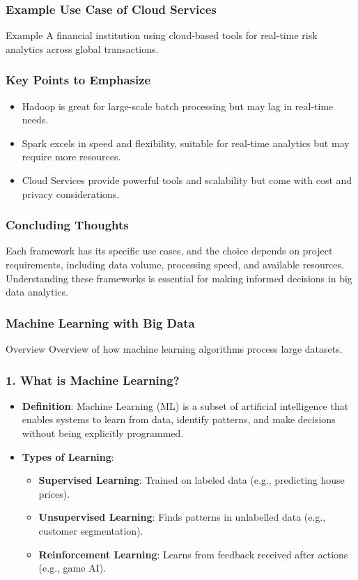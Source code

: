 \documentclass[aspectratio=169]{beamer}
\begin{document}
\begin{frame}[fragile]
    \frametitle{Example Use Case of Cloud Services}
    \begin{block}{Example}
        A financial institution using cloud-based tools for real-time risk analytics across global transactions.
    \end{block}
\end{frame}

\begin{frame}[fragile]
    \frametitle{Key Points to Emphasize}
    \begin{itemize}
        \item Hadoop is great for large-scale batch processing but may lag in real-time needs.
        \item Spark excels in speed and flexibility, suitable for real-time analytics but may require more resources.
        \item Cloud Services provide powerful tools and scalability but come with cost and privacy considerations.
    \end{itemize}
\end{frame}

\begin{frame}[fragile]
    \frametitle{Concluding Thoughts}
    Each framework has its specific use cases, and the choice depends on project requirements, including data volume, processing speed, and available resources. Understanding these frameworks is essential for making informed decisions in big data analytics.
\end{frame}

\begin{frame}[fragile]
    \frametitle{Machine Learning with Big Data}
    \begin{block}{Overview}
    Overview of how machine learning algorithms process large datasets.
    \end{block}
\end{frame}

\begin{frame}[fragile]
    \frametitle{1. What is Machine Learning?}
    \begin{itemize}
        \item \textbf{Definition}: Machine Learning (ML) is a subset of artificial intelligence that enables systems to learn from data, identify patterns, and make decisions without being explicitly programmed.
        \item \textbf{Types of Learning}:
            \begin{itemize}
                \item \textbf{Supervised Learning}: Trained on labeled data (e.g., predicting house prices).
                \item \textbf{Unsupervised Learning}: Finds patterns in unlabelled data (e.g., customer segmentation).
                \item \textbf{Reinforcement Learning}: Learns from feedback received after actions (e.g., game AI).
            \end{itemize}
    \end{itemize}
\end{frame}
\end{document}
